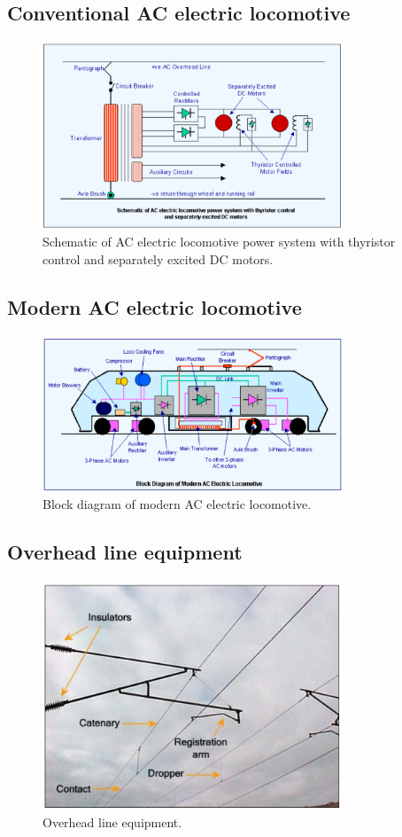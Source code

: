\subsection{Conventional AC electric locomotive}
\begin{figure}[H]
    \centering
    \includegraphics[width = 0.8\textwidth]{img/figure134.png}
    \caption{Schematic of AC electric locomotive power system with thyristor control and separately excited DC motors.}
\end{figure}
\subsection{Modern AC electric locomotive}
\begin{figure}[H]
    \centering
    \includegraphics[width = 0.8\textwidth]{img/figure135.png}
    \caption{Block diagram of modern AC electric locomotive.}
\end{figure}
\subsection{Overhead line equipment}
\begin{figure}[H]
    \centering
    \includegraphics[width = 0.8\textwidth]{img/figure136.png}
    \caption{Overhead line equipment.}
\end{figure}
